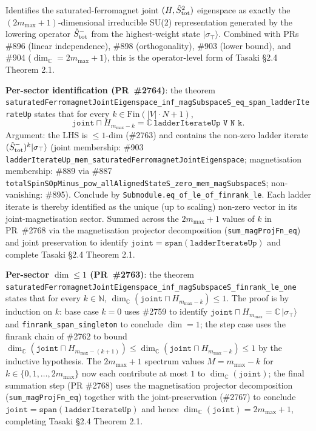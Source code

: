 \documentclass[a4paper,11pt]{article}
\begin{document}
Identifies the saturated-ferromagnet joint $(H, \hat S_{\rm tot}^2)$
eigenspace as exactly the $(2m_{\max}+1)$-dimensional irreducible
SU(2) representation generated by the lowering operator
$\hat S^-_{\rm tot}$ from the highest-weight state
$|\sigma_\top\rangle$. Combined with PRs \#896 (linear independence),
\#898 (orthogonality), \#903 (lower bound), and \#904
($\dim_\mathbb{C} = 2m_{\max}+1$), this is the operator-level form
of Tasaki §2.4 Theorem 2.1.

\textbf{Per-sector identification (PR~\#2764)}: the theorem
\texttt{saturatedFerromagnetJointEigenspace\_inf\_magSubspaceS\_eq\_span\_ladderIterateUp}
states that for every $k \in \mathrm{Fin}(|V|\cdot N + 1)$,
\[
  \texttt{joint} \sqcap H_{m_{\max} - k}
  = \mathbb{C}\,\texttt{ladderIterateUp V N k}.
\]
Argument: the LHS is $\le 1$-dim (\#2763) and contains the non-zero
ladder iterate $(\hat S^-_{\rm tot})^k |\sigma_\top\rangle$
(joint membership: \#903 \texttt{ladderIterateUp\_mem\_saturatedFerromagnetJointEigenspace};
magnetisation membership: \#889 via \#887 \texttt{totalSpinSOpMinus\_pow\_allAlignedStateS\_zero\_mem\_magSubspaceS};
non-vanishing: \#895). Conclude by
\texttt{Submodule.eq\_of\_le\_of\_finrank\_le}. Each ladder iterate
is thereby identified as the unique (up to scaling) non-zero
vector in its joint-magnetisation sector. Summed across the
$2m_{\max}+1$ values of $k$ in PR~\#2768 via the magnetisation
projector decomposition (\texttt{sum\_magProjFn\_eq}) and joint
preservation to identify
$\texttt{joint} = \texttt{span}(\texttt{ladderIterateUp})$ and
complete Tasaki §2.4 Theorem 2.1.

\textbf{Per-sector $\dim \le 1$ (PR~\#2763)}: the theorem
\texttt{saturatedFerromagnetJointEigenspace\_inf\_magSubspaceS\_finrank\_le\_one}
states that for every $k \in \mathbb{N}$,
$\dim_\mathbb{C}(\texttt{joint} \sqcap H_{m_{\max} - k}) \le 1$.
The proof is by induction on $k$: base case $k = 0$ uses \#2759
to identify $\texttt{joint} \sqcap H_{m_{\max}} = \mathbb{C}\,|\sigma_\top\rangle$
and \texttt{finrank\_span\_singleton} to conclude $\dim = 1$;
the step case uses the finrank chain of \#2762 to bound
$\dim_\mathbb{C}(\texttt{joint} \sqcap H_{m_{\max} - (k+1)}) \le
\dim_\mathbb{C}(\texttt{joint} \sqcap H_{m_{\max} - k}) \le 1$ by
the inductive hypothesis. The $2m_{\max}+1$ spectrum values
$M = m_{\max} - k$ for $k \in \{0, 1, \ldots, 2m_{\max}\}$ now each
contribute at most $1$ to $\dim_\mathbb{C}(\texttt{joint})$; the
final summation step (PR \#2768) uses the magnetisation projector
decomposition (\texttt{sum\_magProjFn\_eq}) together with the
joint-preservation (\#2767) to conclude
$\texttt{joint} = \texttt{span}(\texttt{ladderIterateUp})$ and hence
$\dim_\mathbb{C}(\texttt{joint}) = 2m_{\max} + 1$, completing
Tasaki §2.4 Theorem 2.1.
\end{document}
